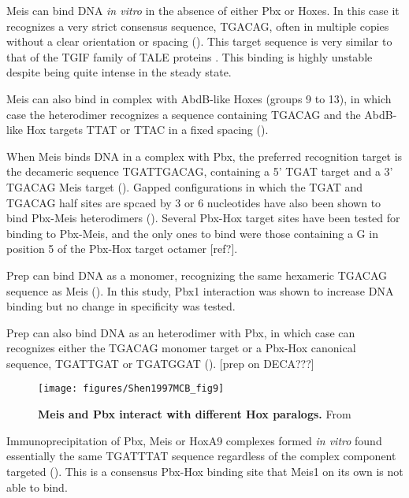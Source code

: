 Meis can bind DNA \textit{in vitro} in the absence of either Pbx or Hoxes. In this case it recognizes a very strict consensus sequence, TGACAG, often in multiple copies without a clear orientation or spacing (\cite{Shen1997}). This target sequence is very similar to that of the TGIF family of TALE proteins \cite{ref}. This binding is highly unstable despite being quite  intense in the steady state. 

Meis can also bind in complex with AbdB-like Hoxes (groups 9 to 13), in which case the heterodimer recognizes a sequence containing TGACAG and the AbdB-like Hox targets TTAT or TTAC in a fixed spacing (\cite{Shen1997}). 

When Meis binds DNA in a complex with Pbx, the preferred recognition target is the decameric sequence TGATTGACAG, containing a 5' TGAT target and a 3' TGACAG Meis target (\cite{Chang1997, Knoepfler1997}). Gapped configurations in which the TGAT and TGACAG half sites are spcaed by 3 or 6 nucleotides have also been shown to bind Pbx-Meis heterodimers (\cite{Jacobs1999}). Several Pbx-Hox target sites have been tested for binding to Pbx-Meis, and the only ones to bind were those containing a G in position 5 of the Pbx-Hox target octamer [ref?]. 

Prep can bind DNA as a monomer, recognizing the same hexameric TGACAG sequence as Meis (\cite{Berthelsen1998a}). In this study, Pbx1 interaction was shown to increase DNA binding but no change in specificity was tested.

Prep can also bind DNA as an heterodimer with Pbx, in which case can recognizes either the TGACAG monomer target or a Pbx-Hox canonical sequence, TGATTGAT or TGATGGAT (\cite{Berthelsen1998}). [prep on DECA???]


\begin{figure}[]
  
  \centering
  \texttt{[image: figures/Shen1997MCB\_fig9]}
  \caption[Meis and Pbx interact with different Hox paralogs]{\textbf{Meis and Pbx interact with different Hox paralogs.} From \cite{Shen1997}}
  \label{fig:Shen1997MCB_fig9}
\end{figure}


Immunoprecipitation of Pbx, Meis or HoxA9 complexes formed \textit{in vitro} found essentially the same TGATTTAT sequence regardless of the complex component targeted (\cite{Shen1999}). This is a consensus Pbx-Hox binding site that Meis1 on its own is not able to bind.

